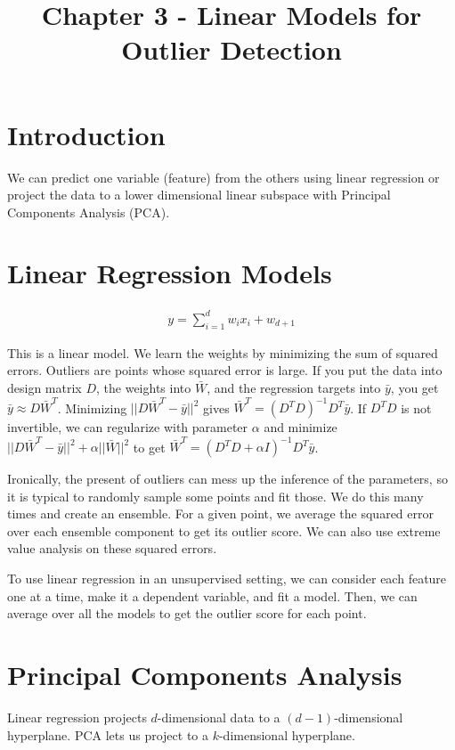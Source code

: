 \documentclass[a4paper]{article}
\title{Chapter 3 - Linear Models for Outlier Detection}
\date{}
\begin{document}
\maketitle

\section{Introduction}
We can predict one variable (feature) from the others using linear regression
or project the data to a lower dimensional linear subspace with Principal
Components Analysis (PCA).
\section{Linear Regression Models}
\begin{align}
  y = \sum_{i=1}^{d}{w_i x_i} + w_{d+1}
\end{align}

This is a linear model. We learn the weights by minimizing the sum of squared
errors. Outliers are points whose squared error is large. If you put the
data into design matrix $D$, the weights into $\bar{W}$, and the regression
targets into $\bar{y}$, you get $\bar{y} \approx D \bar{W}^T$. Minimizing
$||D \bar{W}^T - \bar{y}||^2$ gives $\bar{W}^T = (D^T D)^{-1}D^T \bar{y}$.
If $D^T D$ is not invertible, we can regularize with parameter $\alpha$ and
minimize $||D \bar{W}^T - \bar{y}||^2 + \alpha ||\bar{W}||^2$ to get
$\bar{W}^T = (D^T D + \alpha I)^{-1}D^T \bar{y}$.

Ironically, the present of outliers can mess up the inference of the parameters,
so it is typical to randomly sample some points and fit those. We do this
many times and create an ensemble. For a given point, we average the squared
error over each ensemble component to get its outlier score. We can also
use extreme value analysis on these squared errors.

To use linear regression in an unsupervised setting, we can consider each
feature one at a time, make it a dependent variable, and fit a model. Then,
we can average over all the models to get the outlier score for each point.

\section{Principal Components Analysis}
Linear regression projects $d$-dimensional data to a $(d-1)$-dimensional
hyperplane. PCA lets us project to a $k$-dimensional hyperplane.
\end{document}
